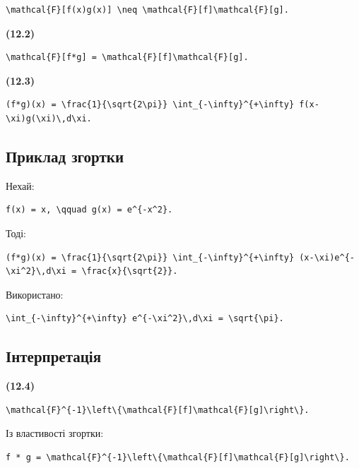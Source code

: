 \documentclass[
  ukrainian,
]{article}
\begin{document}
\begin{verbatim}
\mathcal{F}[f(x)g(x)] \neq \mathcal{F}[f]\mathcal{F}[g].
\end{verbatim}

\textbf{(12.2)}

\begin{verbatim}
\mathcal{F}[f*g] = \mathcal{F}[f]\mathcal{F}[g].
\end{verbatim}

\textbf{(12.3)}

\begin{verbatim}
(f*g)(x) = \frac{1}{\sqrt{2\pi}} \int_{-\infty}^{+\infty} f(x-\xi)g(\xi)\,d\xi.
\end{verbatim}

\subsection{Приклад
згортки}\label{ux43fux440ux438ux43aux43bux430ux434-ux437ux433ux43eux440ux442ux43aux438}

Нехай:

\begin{verbatim}
f(x) = x, \qquad g(x) = e^{-x^2}.
\end{verbatim}

Тоді:

\begin{verbatim}
(f*g)(x) = \frac{1}{\sqrt{2\pi}} \int_{-\infty}^{+\infty} (x-\xi)e^{-\xi^2}\,d\xi = \frac{x}{\sqrt{2}}.
\end{verbatim}

Використано:

\begin{verbatim}
\int_{-\infty}^{+\infty} e^{-\xi^2}\,d\xi = \sqrt{\pi}.
\end{verbatim}

\subsection{Інтерпретація}\label{ux456ux43dux442ux435ux440ux43fux440ux435ux442ux430ux446ux456ux44f}

\textbf{(12.4)}

\begin{verbatim}
\mathcal{F}^{-1}\left\{\mathcal{F}[f]\mathcal{F}[g]\right\}.
\end{verbatim}

Із властивості згортки:

\begin{verbatim}
f * g = \mathcal{F}^{-1}\left\{\mathcal{F}[f]\mathcal{F}[g]\right\}.
\end{verbatim}
\end{document}

